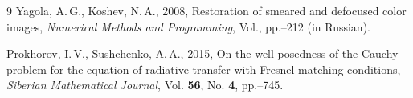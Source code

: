 \documentclass{procDDs}
\begin{document}
\begin {thebibliography}{9}
 Yagola, A.\,G., Koshev, N.\,A., 2008,
Restoration of smeared and defocused color images, 
\emph{Numerical Methods and Programming},
Vol., pp.--212 (in Russian).

 Prokhorov, I.\,V., Sushchenko,  A.\,A., 2015, 
On the well-posedness of the Cauchy problem for the equation of radiative transfer with Fresnel matching conditions,
\emph{Siberian Mathematical Journal},
Vol.\; {\bf 56}, No. {\bf 4}, pp.--745.

\end{thebibliography}
\end{document}
